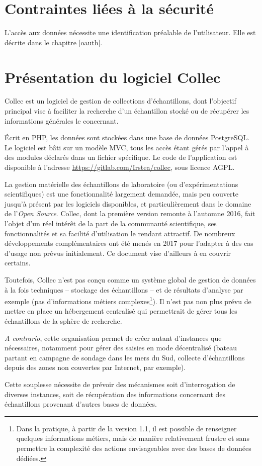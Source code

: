 \section{Contraintes liées à la sécurité}

L'accès aux données nécessite une identification préalable de l'utilisateur. Elle est décrite dans le chapitre \ref{oauth}.

\section{Présentation du logiciel Collec}

Collec est un logiciel de gestion de collections d'échantillons, dont l'objectif principal vise à faciliter la recherche d'un échantillon stocké ou de récupérer les informations générales le concernant.

Écrit en PHP, les données sont stockées dans une base de données PostgreSQL. Le logiciel est bâti sur un modèle MVC, tous les accès étant gérés par l'appel à des modules déclarés dans un fichier spécifique. 
Le code de l'application est disponible à l'adresse \url{https://gitlab.com/Irstea/collec}, sous licence AGPL.


La gestion matérielle des échantillons de laboratoire (ou d'expérimentations scientifiques) est une fonctionnalité largement demandée, mais peu couverte jusqu'à présent par les logiciels disponibles, et particulièrement dans le domaine de l'\textit{Open Source}. Collec, dont la première version remonte à l'automne 2016, fait l'objet d'un réel intérêt de la part de la communauté scientifique, ses fonctionnalités et sa facilité d'utilisation le rendant attractif. De nombreux développements complémentaires ont été menés en 2017 pour l'adapter à des cas d'usage non prévus initialement. Ce document vise d'ailleurs à en couvrir certains.

Toutefois, Collec n'est pas conçu comme un système global de gestion de données à la fois techniques -- stockage des échantillons -- et de résultats d'analyse par exemple (pas d'informations métiers complexes\footnote{Dans la pratique, à partir de la version 1.1, il est possible de renseigner quelques informations métiers, mais de manière relativement frustre et sans permettre la complexité des actions envisageables avec des bases de données dédiées.}).
Il n'est pas non plus prévu de mettre en place un hébergement centralisé qui permettrait de gérer tous les échantillons de la sphère de recherche.

\textit{A contrario}, cette organisation permet de créer autant d'instances que néces\-saires, notamment pour gérer des saisies en mode décentralisé (bateau partant en campagne de sondage dans les mers du Sud, collecte d'échantillons depuis des zones non couvertes par Internet, par exemple).

Cette souplesse nécessite de prévoir des mécanismes soit d'interrogation de diverses instances, soit de récupération des informations concernant des échantillons provenant d'autres bases de données. 

